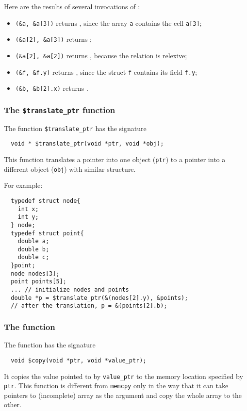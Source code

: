 Here are the results of several invocations of  \ccontains:

\begin{itemize}
\item \texttt{\ccontains(\&a, \&a[3])} returns  \ctrue, since  the array \texttt{a} contains the cell \texttt{a[3]};
\item \texttt{\ccontains(\&a[2], \&a[3])} returns \cfalse;
\item \texttt{\ccontains(\&a[2], \&a[2])} returns \ctrue, because the relation is relexive;
\item  \texttt{\ccontains(\&f, \&f.y)} returns \ctrue, since the struct \texttt{f} contains its field \texttt{f.y};
\item \texttt{\ccontains(\&b, \&b[2].x)} returns \ctrue.
\end{itemize}

\subsubsection{The \texttt{\$translate\_ptr} function}
The function \texttt{\$translate\_ptr} has the signature
\begin{verbatim}
  void * $translate_ptr(void *ptr, void *obj);
\end{verbatim}

This function translates a pointer into one object (\texttt{ptr}) to a pointer into a different object (\texttt{obj}) with similar structure. 

For example:
\begin{verbatim}
  typedef struct node{
    int x;
    int y;
  } node;
  typedef struct point{
    double a;
    double b;
    double c;
  }point;
  node nodes[3];
  point points[5];
  ... // initialize nodes and points
  double *p = $translate_ptr(&(nodes[2].y), &points);
  // after the translation, p = &(points[2].b);
\end{verbatim}

\subsubsection{The \ccopy{} function}

The \ccopy{} function has the signature
\begin{verbatim}
  void $copy(void *ptr, void *value_ptr);
\end{verbatim}

It copies the value pointed to by \texttt{value\_ptr} to the memory 
location specified by \texttt{ptr}. This function is different from \texttt{memcpy} only in the way that
it can take pointers to (incomplete) array as the argument and copy the whole array to the other.

